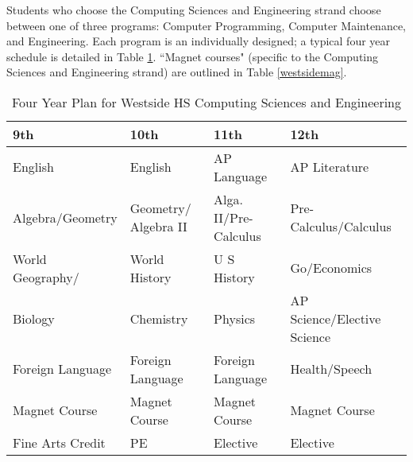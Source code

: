 Students who choose the Computing Sciences and Engineering strand choose between one of three programs: Computer Programming, Computer Maintenance, and Engineering. Each program is an individually designed; a typical four year schedule is detailed in Table \ref{westsidesched}. ``Magnet courses" (specific to the Computing Sciences and Engineering strand) are outlined in Table \ref{westsidemag}. 
\begin{table}[]
\centering
\caption{Four Year Plan for Westside HS Computing Sciences and Engineering \cite{westside}}
\label{westsidesched}
\begin{tabular}{|l|l|l|l|}
	 \hline
\textbf{9th}     & \textbf{10th}        & \textbf{11th}         & \textbf{12th}               \\ \hline
English          & English              & AP Language           & AP Literature               \\ \hline
Algebra/Geometry & Geometry/ Algebra II & Alga. II/Pre-Calculus & Pre-Calculus/Calculus       \\ \hline
World Geography/ & World History        & U S History           & Go/Economics                \\ \hline
Biology          & Chemistry            & Physics               & AP Science/Elective Science \\ \hline
Foreign Language & Foreign Language     & Foreign Language      & Health/Speech               \\ \hline
\rowcolor[HTML]{FFCC67} Magnet Course   & Magnet Course        & Magnet Course         & Magnet Course   \\ \hline
Fine Arts Credit & PE                   & Elective              & Elective					  \\ \hline                   
\end{tabular}
\end{table}


